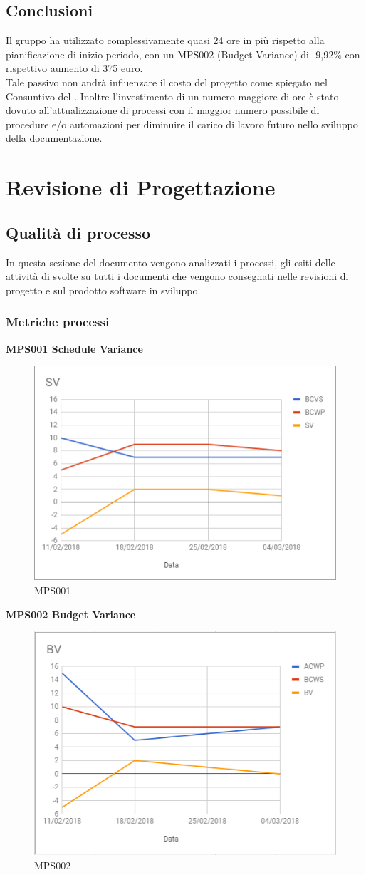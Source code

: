 \documentclass[PianoDiQualifica.tex]{subfiles}
\begin{document}
\subsection{Conclusioni}
Il gruppo ha utilizzato complessivamente quasi 24 ore in più rispetto alla pianificazione di inizio periodo, con un MPS002 (Budget Variance) di -9,92\% con rispettivo aumento di 375 euro.\\
Tale passivo non andrà influenzare il costo del progetto come spiegato nel Consuntivo del \pdp{}.
Inoltre l'investimento di un numero maggiore di ore è stato dovuto all'attualizzazione di processi con il maggior numero possibile di procedure e/o automazioni per diminuire il carico di lavoro futuro nello sviluppo della documentazione.

	
\section{Revisione di Progettazione}
	
\subsection{Qualità di processo}
In questa sezione del documento vengono analizzati i processi, gli esiti delle attività di  svolte su tutti i documenti che vengono consegnati nelle revisioni di progetto e sul prodotto software in sviluppo.

\subsubsection{Metriche processi}

\textbf{MPS001 Schedule Variance}
\begin{figure}[htb]
	\centering
	\includegraphics[width=0.5\linewidth]{RP/SV}
	\caption{MPS001}
	\label{fig:processi}
\end{figure}

\textbf{MPS002 Budget Variance}
\begin{figure}[htb]
	\centering
	\includegraphics[width=0.5\linewidth]{RP/BV}
	\caption{MPS002}
	\label{fig:processi}
\end{figure}
\end{document}
